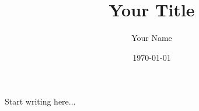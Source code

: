 \documentclass[11pt]{article}
\title{Your Title}
\author{Your Name}
\date{\today}
\begin{document}
\maketitle

Start writing here...
\end{document}

